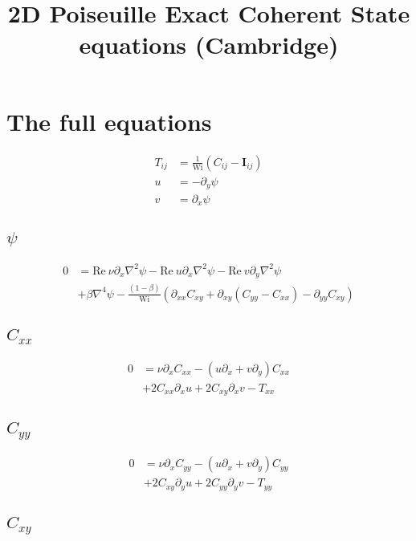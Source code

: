 \documentclass[12,a4paper]{article}
\newcommand{\dd}[1]{\partial_{#1}}
\newcommand{\lpl}{\nabla^{2}}
\newcommand{\bih}{\nabla^{4}}
\newcommand{\Wi}{\mathrm{Wi}}
\newcommand{\Rey}{\mathrm{Re \ }}
\newcommand{\II}{\mathbf{I}}
\begin{document}
\title{2D Poiseuille Exact Coherent State equations (Cambridge)}
\maketitle

\section{The full equations}
\begin{align}
    T_{ij} &= \frac{1}{\Wi} (C_{ij} - \II_{ij}) \\
    u	   &= -\dd{y} \psi \\
    v	   &= \dd{x} \psi
\end{align}

\subsection{$\psi$}

\begin{align}
    0 &= \Rey\nu\dd{x}\lpl\psi - \Rey u \dd{x} \lpl \psi - \Rey v \dd{y} \lpl \psi \nonumber\\
      &+ \beta \bih \psi - \frac{(1-\beta)}{\Wi} \left( \dd{xx} C_{xy} + \dd{xy}(C_{yy} - C_{xx}) - \dd{yy} C_{xy}\right)
\end{align}

\subsection{$C_{xx}$}

\begin{align}
    0 &= \nu \dd{x} C_{xx} - (u\dd{x} + v\dd{y}) C_{xx} \nonumber\\
      &+ 2C_{xx}\dd{x}u + 2C_{xy}\dd{x}v -  T_{xx}
\end{align}

\subsection{$C_{yy}$}

\begin{align}
    0 &= \nu \dd{x} C_{yy} - (u\dd{x} + v\dd{y}) C_{yy} \nonumber\\
    &+ 2C_{xy} \dd{y}u + 2C_{yy}\dd{y}v - T_{yy}
\end{align}

\subsection{$C_{xy}$}
\end{document}
